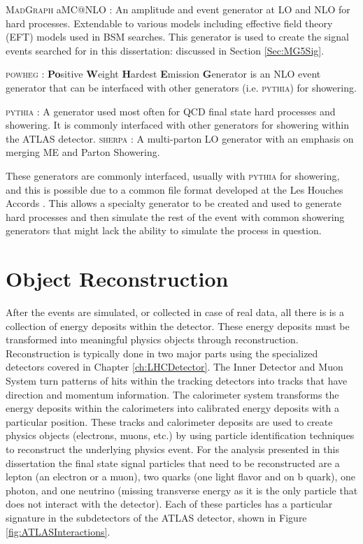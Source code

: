 \textsc{MadGraph} aMC@NLO \cite{MadGraph}: An amplitude and event generator at LO and NLO for hard processes.  Extendable to various models including effective field theory (EFT) models used in BSM searches.  This generator is used to create the signal events searched for in this dissertation: discussed in Section \ref{Sec:MG5Sig}. 

\textsc{powheg} \cite{Powheg1,Powheg2}: \textbf{Po}sitive \textbf{W}eight \textbf{H}ardest \textbf{E}mission \textbf{G}enerator is an NLO event generator that can be interfaced with other generators (i.e. \textsc{pythia}) for showering.

\textsc{pythia} \cite{Pythia8}: A generator used most often for QCD final state hard processes and showering.  It is commonly interfaced with other generators for showering within the ATLAS detector.
\textsc{sherpa} \cite{Sherpa11,Sherpa22}: A multi-parton LO generator with an emphasis on merging ME and Parton Showering.

These generators are commonly interfaced, usually with \textsc{pythia} for showering, and this is possible due to a common file format developed at the Les Houches Accords \cite{Alwall:2006yp}.  This allows a specialty generator to be created and used to generate hard processes and then simulate the rest of the event with common showering generators that might lack the ability to simulate the process in question.

\section{Object Reconstruction}

After the events are simulated, or collected in case of real data, all there is is a collection of energy deposits within the detector.  These energy deposits must be transformed into meaningful physics objects through reconstruction.  Reconstruction is typically done in two major parts using the specialized detectors covered in Chapter \ref{ch:LHCDetector}.  The Inner Detector and Muon System turn patterns of hits within the tracking detectors into tracks that have direction and momentum information.  The calorimeter system transforms the energy deposits within the calorimeters into calibrated energy deposits with a particular position.  These tracks and calorimeter deposits are used to create physics objects (electrons, muons, etc.) by using particle identification techniques to reconstruct the underlying physics event.  For the analysis presented in this dissertation the final state signal particles that need to be reconstructed are a lepton (an electron or a muon), two quarks (one light flavor and on b quark), one photon, and one neutrino (missing transverse energy as it is the only particle that does not interact with the detector).  Each of these particles has a particular signature in the subdetectors of the ATLAS detector, shown in Figure \ref{fig:ATLASInteractions}.


